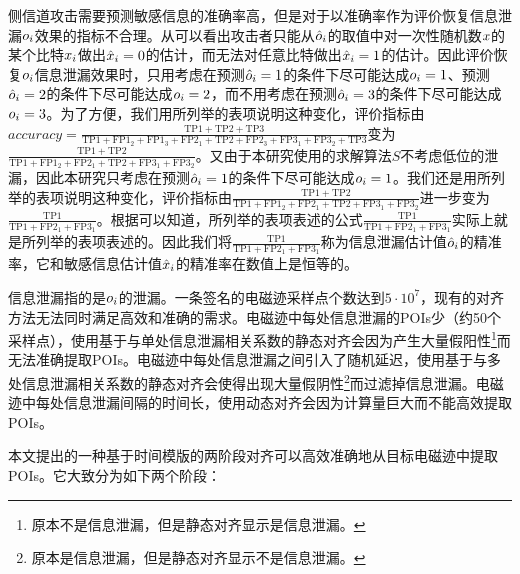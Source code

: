 {	%
	侧信道攻击需要预测敏感信息的准确率高，但是对于以准确率作为评价恢复信息泄漏$o_i$效果的指标不合理。从可以看出攻击者只能从$\hat{o}_i$的取值中对一次性随机数$x$的某个比特$x_i$做出$\hat{x}_i=0$的估计，而无法对任意比特做出$\hat{x}_i=1$的估计。因此评价恢复$o_i$信息泄漏效果时，只用考虑在预测$\hat{o}_i=1$的条件下尽可能达成$o_i=1$、预测$\hat{o}_i=2$的条件下尽可能达成$o_i=2$，而不用考虑在预测$\hat{o}_i=3$的条件下尽可能达成$o_i=3$。为了方便，我们用所列举的表项说明这种变化，评价指标由$accuracy=\frac{\mathrm{TP}1+\mathrm{TP}2+\mathrm{TP}3}{\mathrm{TP}1+\mathrm{FP}1_2+\mathrm{FP}1_3+\mathrm{FP}2_1+\mathrm{TP}2+\mathrm{FP}2_3+\mathrm{FP}3_1+\mathrm{FP}3_2+\mathrm{TP}3}$变为$\frac{\mathrm{TP}1+\mathrm{TP}2}{\mathrm{TP}1+\mathrm{FP}1_2+\mathrm{FP}2_1+\mathrm{TP}2+\mathrm{FP}3_1+\mathrm{FP}3_2}$。又由于本研究使用的求解算法$S$不考虑低位的泄漏，因此本研究只考虑在预测$\hat{o}_i=1$的条件下尽可能达成$o_i=1$。我们还是用所列举的表项说明这种变化，评价指标由$\frac{\mathrm{TP}1+\mathrm{TP}2}{\mathrm{TP}1+\mathrm{FP}1_2+\mathrm{FP}2_1+\mathrm{TP}2+\mathrm{FP}3_1+\mathrm{FP}3_2}$进一步变为$\frac{\mathrm{TP}1}{\mathrm{TP}1+\mathrm{FP}2_1+\mathrm{FP}3_1}$。根据可以知道，所列举的表项表述的公式$\frac{\mathrm{TP}1}{\mathrm{TP}1+\mathrm{FP}2_1+\mathrm{FP}3_1}$实际上就是所列举的表项表述的。因此我们将$\frac{\mathrm{TP}1}{\mathrm{TP}1+\mathrm{FP}2_1+\mathrm{FP}3_1}$称为信息泄漏估计值$\hat{o}_i$的精准率，它和敏感信息估计值$\hat{x}_i$的精准率在数值上是恒等的。
	
	信息泄漏指的是$o_i$的泄漏。一条签名的电磁迹采样点个数达到$5\cdot10^{7}$，现有的对齐方法无法同时满足高效和准确的需求。电磁迹中每处信息泄漏的POIs少（约50个采样点），使用基于与单处信息泄漏相关系数的静态对齐会因为产生大量假阳性\footnote{原本不是信息泄漏，但是静态对齐显示是信息泄漏。}而无法准确提取POIs。电磁迹中每处信息泄漏之间引入了随机延迟，使用基于与多处信息泄漏相关系数的静态对齐会使得出现大量假阴性\footnote{原本是信息泄漏，但是静态对齐显示不是信息泄漏。}而过滤掉信息泄漏。电磁迹中每处信息泄漏间隔的时间长，使用动态对齐会因为计算量巨大而不能高效提取POIs。
	
	本文提出的一种基于时间模版的两阶段对齐可以高效准确地从目标电磁迹中提取POIs。它大致分为如下两个阶段：
	
}
